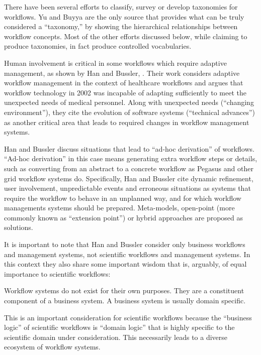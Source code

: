 There have been several efforts to classify, survey or develop taxonomies
for workflows. Yu and Buyya are the only source that provides what can
be truly considered a ``taxonomy,'' by showing the hierarchical
relationships between workflow concepts. Most of the other efforts
discussed below, while claiming to produce taxonomies, in fact produce
controlled vocabularies.

Human involvement is critical in some workflows which require adaptive
management, as shown by Han and Bussler, \cite{han_taxonomy_1998}. Their work
considers adaptive workflow management in the context of healthcare
workflows and argues that workflow technology in 2002 was incapable of
adapting sufficiently to meet the unexpected needs of medical personnel.
Along with unexpected needs (``changing environment''), they cite the
evolution of software systems (``technical advances'') as another
critical area that leads to required changes in workflow management
systems.

Han and Bussler discuss situations that lead to ``ad-hoc derivation'' of
workflows. ``Ad-hoc derivation'' in this case means generating extra
workflow steps or details, such as converting from an abstract to a
concrete workflow as Pegasus and other grid workflow systems do.
Specifically, Han and Bussler cite dynamic refinement, user involvement,
unpredictable events and erroneous situations as systems that require
the workflow to behave in an unplanned way, and for which
workflow managements systems should be prepared. Meta-models, open-point
(more commonly known as ``extension point'') or hybrid approaches are
proposed as solutions.

It is important to note that Han and Bussler consider only business
workflows and management systems, not scientific workflows and
management systems. In this context they also share some important
wisdom that is, arguably, of equal importance to scientific workflows:

\begin{displayquote}
Workflow systems do not exist for their own purposes. They
are a constituent component of a business system. A business system is usually domain
specific.
\end{displayquote}

This is an important consideration for scientific workflows because the
``business logic'' of scientific workflows is ``domain logic'' that is
highly specific to the scientific domain under consideration. This
necessarily leads to a diverse ecosystem of workflow systems.

